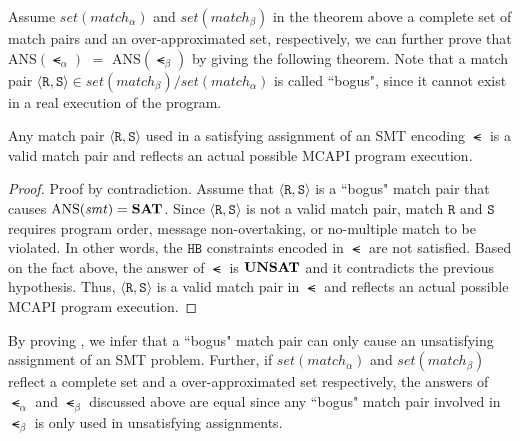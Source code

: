 Assume $\mathit{set(match_{\alpha})}$ and
$\mathit{set(match_{\beta})}$ in the theorem above a complete set of
match pairs and an over-approximated set, respectively, we can further
prove that $\mathrm{ANS}(\smt_{\alpha})$ $ = $
$\mathrm{ANS}(\smt_{\beta})$ by giving the following theorem. Note
that a match pair $\langle \mathtt{R},\mathtt{S}\rangle \in
\mathit{set(match_{\beta})}/\mathit{set(match_{\alpha})}$ is called
``bogus", since it cannot exist in a real execution of the program.

\begin{theorem} \label{thm:two}
Any match pair $\langle \mathtt{R}, \mathtt{S}\rangle$ used in a
satisfying assignment of an SMT encoding $\smt$ is a valid match pair
and reflects an actual possible MCAPI program execution.
\end{theorem}

\begin{proof}
Proof by contradiction. Assume that $\langle \mathtt{R},
\mathtt{S}\rangle$ is a ``bogus" match pair that causes
$\mathrm{ANS}(\mathit{smt}) = \textbf{SAT}$. Since $\langle \mathtt{R},
\mathtt{S}\rangle$ is not a valid match pair, match $\mathtt{R}$ and
$\mathtt{S}$ requires program order, message non-overtaking, or
no-multiple match to be violated. In other words, the $\mathtt{HB}$
constraints encoded in $\smt$ are not satisfied. Based on the fact
above, the answer of $\smt$ is $\textbf{UNSAT}$ and it contradicts the
previous hypothesis. Thus, $\langle \mathtt{R}, \mathtt{S}\rangle$ is
a valid match pair in $\smt$ and reflects an actual possible MCAPI
program execution.
\end{proof}

By proving , we infer that a ``bogus" match pair can
only cause an unsatisfying assignment of an SMT problem. Further, if
$\mathit{set(match_{\alpha})}$ and $\mathit{set(match_{\beta})}$
reflect a complete set and a over-approximated set respectively, the
answers of $\smt_{\alpha}$ and $\smt_{\beta}$ discussed above are
equal since any ``bogus" match pair involved in $\smt_{\beta}$ is only
used in unsatisfying assignments.

